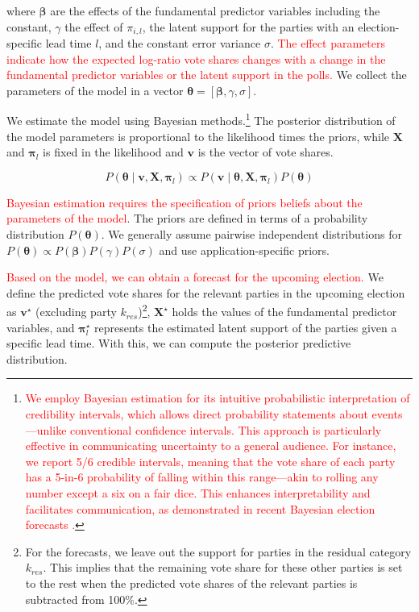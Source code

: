 \documentclass[doublespaced,12pt]{article}
\begin{document}
\begin{doublespacing}
where $\boldsymbol{\beta}$ are the effects of the fundamental predictor variables including the constant, $\gamma$ the effect of ${\pi}_{i,l}$, the latent support for the parties  with an election-specific lead time $l$, and the constant error variance $\sigma$. \textcolor{red}{The effect parameters indicate how the expected log-ratio vote shares changes with a change in the fundamental predictor variables or the latent support in the polls.} We collect the parameters of the model in a vector $\bm{\theta}  = [\bm{\beta},\gamma,\sigma]$. 

We estimate the model using Bayesian methods.\footnote{\textcolor{red}{We employ Bayesian estimation for its intuitive probabilistic interpretation of credibility intervals, which allows direct probability statements about events—unlike conventional confidence intervals. This approach is particularly effective in communicating uncertainty to a general audience. For instance, we report 5/6 credible intervals, meaning that the vote share of each party has a 5-in-6 probability of falling within this range—akin to rolling any number except a six on a fair dice. This enhances interpretability and facilitates communication, as demonstrated in recent Bayesian election forecasts \citep{Stoetzer_Neunhoeffer_Gschwend_Munzert_Sternberg_2019, Kang2024forecasting, Chen2023polls}.}} The posterior distribution of the model parameters is proportional to the likelihood times the priors, while $\boldsymbol{X}$ and $\boldsymbol{\pi}_{l}$ is fixed in the likelihood  and $\bm{v}$ is the vector of vote shares. 

\begin{equation}
    P\left(\bm{\theta} \mid \bm{v},  \bm{X},  \bm{\pi}_{l} \right) \propto  P\left(\bm{v} \mid \bm{\theta},\bm{X},  \bm{\pi}_{l}\right) P\left(\bm{\theta}\right)
\end{equation}

\textcolor{red}{Bayesian estimation requires the specification of priors  beliefs about the parameters of the model}. The priors are defined in terms of a probability distribution $P\left(\bm{\theta}\right)$. We generally assume pairwise independent distributions for $P\left(\bm{\theta}\right) \propto P\left(\bm{\beta}\right)P\left( \gamma\right)P\left(\sigma \right)$ and use application-specific priors.

\textcolor{red}{Based on the model, we can obtain a forecast for the upcoming election.} We define the predicted vote shares for the relevant parties in the upcoming election as $\bm{v}^{\star}$ (excluding party $k_{res}$)\footnote{For the forecasts, we leave out the support for parties in the residual category $k_{res}$. This implies that the remaining vote share for these other parties is set to the rest when the predicted vote shares of the relevant parties is subtracted from 100\%.}, $\bm{X}^{\star}$ holds the values of the fundamental predictor variables, and $\bm{\pi}_{l}^{\star}$ represents the estimated  latent support of the parties given a specific lead time. With this, we can compute the posterior predictive distribution. 



\end{doublespacing}
\end{document}
